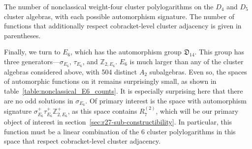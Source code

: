 \documentclass[12pt]{article}
\begin{document}
\begin{table}
\caption{The number of nonclassical weight-four cluster polylogarithms on the $D_4$ and $D_5$ cluster algebras, with each possible automorphism signature. The number of functions that additionally respect cobracket-level cluster adjacency is given in parentheses.}
\label{table:nonclassical_Dn_counts}
\end{table}


Finally, we turn to $E_6$, which has the automorphism group ${\mathfrak D}_{14}$. This group has three generators---$\sigma_{E_6}$, $\tau_{E_6}$, and $\mathbb{Z}_{2,E_6}$. $E_6$ is much larger than any of the cluster algebras considered above, with 504 distinct $A_2$ subalgebras. Even so, the spaces of automorphic functions on it remains surprisingly small, as shown in table~\ref{table:nonclassical_E6_counts}. It is especially surprising here that there are no odd solutions in $\sigma_{E_6}$. Of primary interest is the space with automorphism signature $\sigma_{E_6}^+ \tau_{E_6}^+ \mathbb{Z}_{2,E_6}^+$, as this space contains $R^{(2)}_7$, which will be our primary object of interest in section~\ref{sec:r27-sub-constructibility}. In particular, this function must be a linear combination of the 6 cluster polylogarithms in this space that respect cobracket-level cluster adjacency.
\end{document}
